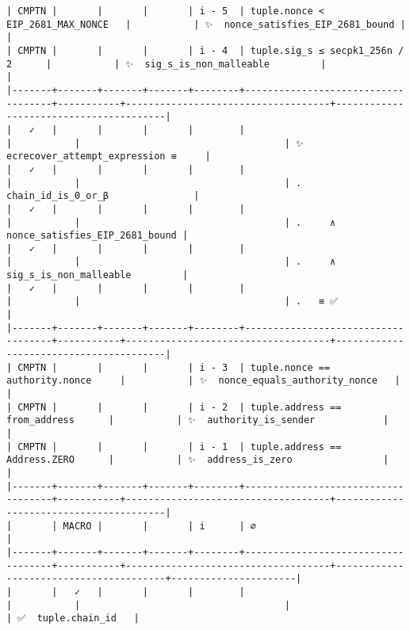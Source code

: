 \documentclass[varwidth=\maxdimen,margin=0.5cm,multi={verbatim}]{standalone}
\begin{document}
\begin{verbatim}
| CMPTN |       |       |       | i - 5  | tuple.nonce < EIP_2681_MAX_NONCE   |           | ✨  nonce_satisfies_EIP_2681_bound |                                        |
| CMPTN |       |       |       | i - 4  | tuple.sig_s ≤ secpk1_256n / 2      |           | ✨  sig_s_is_non_malleable         |                                        |
|-------+-------+-------+-------+--------+------------------------------------+-----------+------------------------------------+----------------------------------------|
|   ✓   |       |       |       |        |                                    |           |                                    | ✨  ecrecover_attempt_expression ≡     |
|   ✓   |       |       |       |        |                                    |           |                                    | .     chain_id_is_0_or_β               |
|   ✓   |       |       |       |        |                                    |           |                                    | .     ∧ nonce_satisfies_EIP_2681_bound |
|   ✓   |       |       |       |        |                                    |           |                                    | .     ∧ sig_s_is_non_malleable         |
|   ✓   |       |       |       |        |                                    |           |                                    | .   ≡ ✅                               |
|-------+-------+-------+-------+--------+------------------------------------+-----------+------------------------------------+----------------------------------------|
| CMPTN |       |       |       | i - 3  | tuple.nonce == authority.nonce     |           | ✨  nonce_equals_authority_nonce   |                                        |
| CMPTN |       |       |       | i - 2  | tuple.address == from_address      |           | ✨  authority_is_sender            |                                        |
| CMPTN |       |       |       | i - 1  | tuple.address == Address.ZERO      |           | ✨  address_is_zero                |                                        |
|-------+-------+-------+-------+--------+------------------------------------+-----------+------------------------------------+----------------------------------------|
|       | MACRO |       |       | i      | ∅                                  |
|-------+-------+-------+-------+--------+------------------------------------+-----------+------------------------------------+----------------------------------------+----------------------|
|       |   ✓   |       |       |        |                                    |           |                                    |                                        | ✅  tuple.chain_id   |

\end{verbatim}
\end{document}
